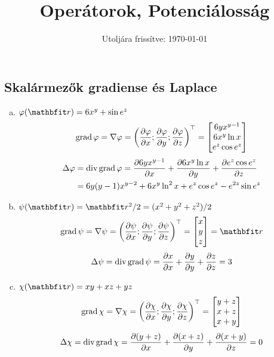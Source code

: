 \documentclass{szb-solution}
\title{Operátorok, Potenciálosság}
\date{Utoljára frissítve: \today}
\begin{document}
\maketitle

\subsection{Skalármezők gradiense és Laplace}

\begin{enumerate}[a)]
  \item $\varphi(\coordvec) = 6x^y + \sin e^z$
        $$
          \operatorname{grad} \varphi
          =
          \nabla \varphi
          =
          \left(
          \pdv{\varphi}{x}; \pdv{\varphi}{y}; \pdv{\varphi}{z}
          \right)^\top
          = \begin{bmatrix}
            6 y x^{y - 1} \\
            6 x^y \ln x   \\
            e^z \cos e^z
          \end{bmatrix}
        $$
        \begin{align*}
          \Delta \varphi
           & =
          \operatorname{div} \operatorname{grad} \varphi
          =
          \pdv{6 y x^{y - 1}}{x} +
          \pdv{6 x^y \ln x}{y} +
          \pdv{e^z \cos e^z}{z}
          \\
           & =
          6 y (y - 1) x^{y - 2} + 6 x^y \ln^2 x + e^z \cos e^z - e^{2z} \sin e^z
        \end{align*}

  \item $\psi(\coordvec) = \coordvec^2 / 2 = (x^2 + y^2 + z^2) / 2$
        $$
          \grad \psi
          =
          \nabla \psi
          =
          \left(
          \pdv{\psi}{x}; \pdv{\psi}{y}; \pdv{\psi}{z}
          \right)^\T
          =
          \begin{bmatrix}
            x \\ y \\ z
          \end{bmatrix}
          =
          \coordvec
        $$
        $$
          \Delta \psi
          =
          \operatorname{div} \operatorname{grad} \psi
          =
          \pdv{x}{x} + \pdv{y}{y} + \pdv{z}{z}
          =
          3
        $$

  \item $\chi(\coordvec) = xy + xz + yz$
        $$
          \operatorname{grad} \chi
          =
          \nabla \chi
          =
          \left(
          \pdv{\chi}{x}; \pdv{\chi}{y}; \pdv{\chi}{z}
          \right)^\top
          =
          \begin{bmatrix}
            y + z \\ x + z \\ x + y
          \end{bmatrix}
        $$
        $$
          \Delta \chi
          =
          \operatorname{div} \operatorname{grad} \chi
          =
          \pdv{(y + z)}{x} + \pdv{(x + z)}{y} + \pdv{(x + y)}{z}
          =
          0
        $$


\end{enumerate}
\end{document}
